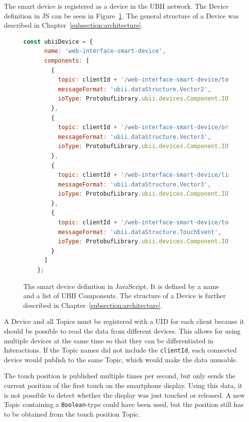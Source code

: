 The smart device is registered as a device in the \ac{UBII} network. The Device definition in \ac{JS} can be seen in Figure~\ref{fig:ubii-device-registration}. The general structure of a Device was described in Chapter~\ref{subsection:architecture}.

\begin{figure}[H]
	\begin{lstlisting}[language=JavaScript]
    const ubiiDevice = {
      name: 'web-interface-smart-device',
      components: [
        {
          topic: clientId + '/web-interface-smart-device/touch_position',
          messageFormat: 'ubii.dataStructure.Vector2',
          ioType: ProtobufLibrary.ubii.devices.Component.IOType.INPUT
        },
        {
          topic: clientId + '/web-interface-smart-device/orientation',
          messageFormat: 'ubii.dataStructure.Vector3',
          ioType: ProtobufLibrary.ubii.devices.Component.IOType.INPUT
        },
        {
          topic: clientId + '/web-interface-smart-device/linear_acceleration',
          messageFormat: 'ubii.dataStructure.Vector3',
          ioType: ProtobufLibrary.ubii.devices.Component.IOType.INPUT
        },
        {
          topic: clientId + '/web-interface-smart-device/touch_events',
          messageFormat: 'ubii.dataStructure.TouchEvent',
          ioType: ProtobufLibrary.ubii.devices.Component.IOType.INPUT
        }
      ]
    };
  \end{lstlisting}
	\caption[Protobuf definition of the smart device]{The smart device definition in JavaScript. It is defined by a name and a list of \ac{UBII} Components. The structure of a Device is further described in Chapter~\ref{subsection:architecture}.}\label{fig:ubii-device-registration}
\end{figure}

A Device and all Topics must be registered with a \ac{UID} for each client because it should be possible to read the data from different devices. This allows for using multiple devices at the same time so that they can be differentiated in Interactions. If the Topic names did not include the \lstinline{clientId}, each connected device would publish to the same Topic, which would make the data unusable.

The touch position is published multiple times per second, but only sends the current position of the first touch on the smartphone display. Using this data, it is not possible to detect whether the display was just touched or released. A new Topic containing a \lstinline{Boolean}-type could have been used, but the position still has to be obtained from the touch position Topic.

